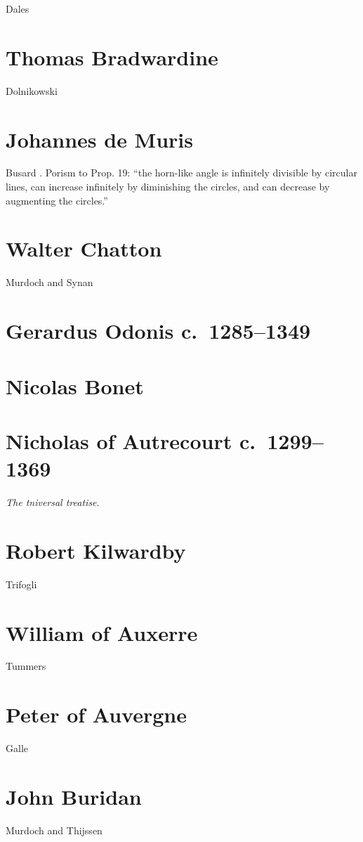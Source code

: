 \documentclass{article}
\begin{document}
Dales \cite{dales1984}

\section{Thomas Bradwardine}
Dolnikowski \cite{dolnikowski}


\section{Johannes de Muris}
Busard \cite[p.~35]{demuris}. Porism to Prop. 19: ``the horn-like
angle is infinitely divisible by circular lines, can increase infinitely
by diminishing the circles, and can decrease by augmenting
the circles.''

\section{Walter Chatton}
Murdoch and Synan \cite{synan}

\section{Gerardus Odonis c.~1285--1349}


\section{Nicolas Bonet}

\section{Nicholas of Autrecourt c.~1299--1369}
{\em The tniversal treatise}. 

\section{Robert Kilwardby}
Trifogli \cite{kilwardby}

\section{William of Auxerre}
Tummers \cite{tummers}

\section{Peter of Auvergne}
Galle \cite[pp.~277*--330*]{galle}

\section{John Buridan}
Murdoch and Thijssen \cite{buridan}
\end{document}
